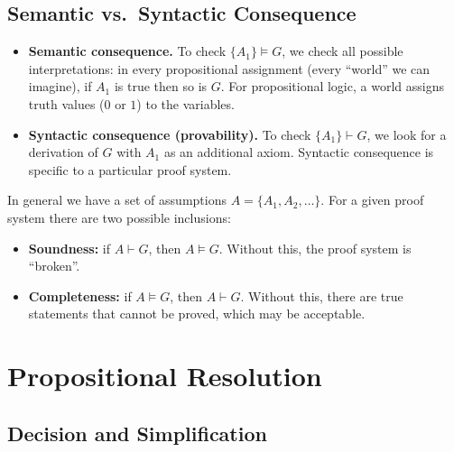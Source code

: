 \subsection{Semantic vs.\ Syntactic Consequence}
 
\begin{itemize}
  \item \textbf{Semantic consequence.} To check $\{A_1\} \models G$, we check all possible interpretations: in every propositional assignment (every ``world'' we can imagine), if $A_1$ is true then so is $G$. For propositional logic, a world assigns truth values ($0$ or $1$) to the variables.
  \item \textbf{Syntactic consequence (provability).} To check $\{A_1\} \vdash G$, we look for a derivation of $G$ with $A_1$ as an additional axiom. Syntactic consequence is specific to a particular proof system.
\end{itemize}
 
In general we have a set of assumptions $A = \{A_1, A_2, \ldots\}$. For a given proof system there are two possible inclusions:
\begin{itemize}
  \item \textbf{Soundness:} if $A \vdash G$, then $A \models G$. Without this, the proof system is ``broken''.
  \item \textbf{Completeness:} if $A \models G$, then $A \vdash G$. Without this, there are true statements that cannot be proved, which may be acceptable.
\end{itemize}


\section{Propositional Resolution}
 
\subsection{Decision and Simplification}
 
 
 
